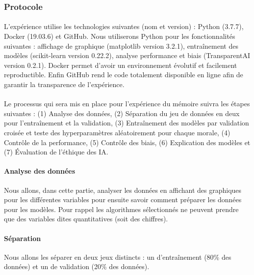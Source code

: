 \documentclass[10pt, french, a4paper]{report}
\begin{document}
\subsubsection{Protocole}

\paragraph{}
L'expérience utilise les technologies suivantes (nom et version) : Python (3.7.7), Docker (19.03.6) et GitHub. Nous utiliserons Python pour les fonctionnalités suivantes : affichage de graphique (matplotlib version 3.2.1), entraînement des modèles (scikit-learn version 0.22.2), analyse performance et biais (TransparentAI version 0.2.1). Docker permet d'avoir un environnement évolutif et facilement reproductible. Enfin GitHub rend le code totalement disponible en ligne afin de garantir la transparence de l'expérience.

\paragraph{}
Le processus qui sera mis en place pour l'expérience du mémoire suivra les étapes suivantes : (1) Analyse des données, (2) Séparation du jeu de données en deux pour l'entraînement et la validation, (3) Entraînement des modèles par validation croisée et teste des hyperparamètres aléatoirement pour chaque morale, (4) Contrôle de la performance, (5) Contrôle des biais, (6) Explication des modèles et (7) \uppercase{é}valuation de l'éthique des IA.

\paragraph{Analyse des données} Nous allons, dans cette partie, analyser les données en affichant des graphiques pour les différentes variables pour ensuite savoir comment préparer les données pour les modèles. Pour rappel les algorithmes sélectionnés ne peuvent prendre que des variables dites quantitatives (soit des chiffres).

\paragraph{Séparation} Nous allons les séparer en deux jeux distincts : un d'entraînement (80\% des données) et un de validation (20\% des données).
\end{document}
